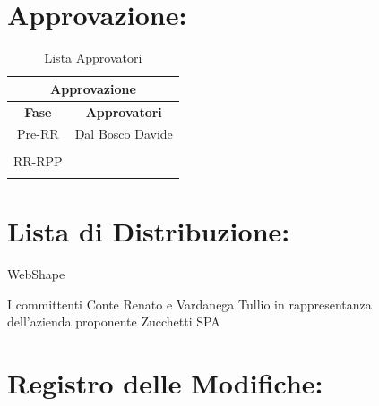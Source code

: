 \newpage
\section*{\LARGE Approvazione:}
\begin{table}[!h]
	\begin{center}
		\begin{tabular}
			{|c|c|}
			\hline
			\multicolumn{2}{|c|}{ \textbf{Approvazione} } \\
			\hline
			\textbf{Fase} & \textbf{Approvatori} \\
			\hline
			Pre-RR  &  Dal Bosco Davide\\
									&  \\
			\hline
			RR-RPP & \\
									& \\
			\hline
		\end{tabular}
		\caption{Lista Approvatori} %
		\label{tabapprovazione}
	\end{center}
\end{table}


\section*{\LARGE Lista di Distribuzione:}

	\begin{elenconumerato}{\normindent}
		\item WebShape
		\item I committenti Conte Renato e Vardanega Tullio in rappresentanza \\  dell'azienda proponente Zucchetti SPA
	\end{elenconumerato}

\newpage



\section*{\LARGE Registro delle Modifiche:}


